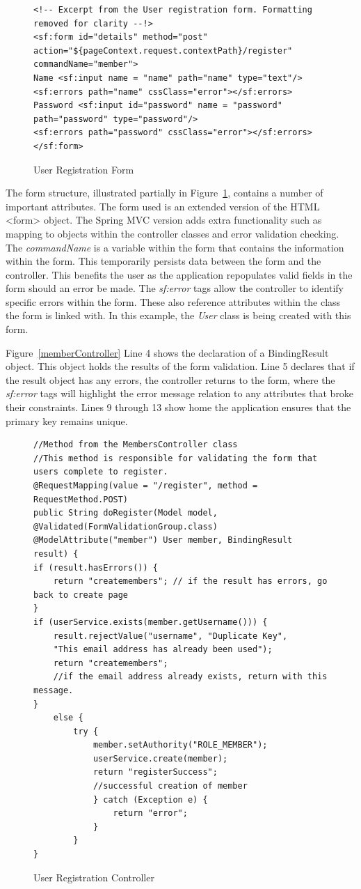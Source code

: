 \begin{figure}[H]
\begin{lstlisting}
<!-- Excerpt from the User registration form. Formatting removed for clarity --!>
<sf:form id="details" method="post" action="${pageContext.request.contextPath}/register" commandName="member">
Name <sf:input name = "name" path="name" type="text"/>
<sf:errors path="name" cssClass="error"></sf:errors>
Password <sf:input id="password" name = "password" path="password" type="password"/>
<sf:errors path="password" cssClass="error"></sf:errors>
</sf:form>
\end{lstlisting}
\caption{User Registration Form}
\label{fig:memberForm}
\end{figure}

The form structure, illustrated partially in Figure~\ref{fig:memberForm}, contains a number of important attributes. The form used is an extended version of the HTML <form> object. The Spring MVC version adds extra functionality such as mapping to objects within the controller classes and error validation checking. The \textit{commandName} is a variable within the form that contains the information within the form. This temporarily persists data between the form and the controller. This benefits the user as the application repopulates valid fields in the form should an error be made. The \textit{sf:error} tags allow the controller to identify specific errors within the form. These also reference attributes within the class the form is linked with. In this example, the \textit{User} class is being created with this form. 

Figure~\ref{memberController} Line 4 shows the declaration of a BindingResult object. This object holds the results of the form validation. Line 5 declares that if the result object has any errors, the controller returns to the form, where the \textit{sf:error} tags will highlight the error message relation to any attributes that broke their constraints. Lines 9 through 13 show home the application ensures that the primary key remains unique. 

\begin{figure}[H]
\begin{lstlisting}
//Method from the MembersController class
//This method is responsible for validating the form that users complete to register.
@RequestMapping(value = "/register", method = RequestMethod.POST)
public String doRegister(Model model,
@Validated(FormValidationGroup.class) @ModelAttribute("member") User member, BindingResult result) {
if (result.hasErrors()) {
	return "createmembers"; // if the result has errors, go back to create page
}
if (userService.exists(member.getUsername())) {
	result.rejectValue("username", "Duplicate Key",
	"This email address has already been used");
	return "createmembers";
	//if the email address already exists, return with this message.
}
	else {
		try {
			member.setAuthority("ROLE_MEMBER");
			userService.create(member);
			return "registerSuccess";
			//successful creation of member
			} catch (Exception e) {
				return "error";
			}
		}
}
\end{lstlisting}
\caption{User Registration Controller}
\label{fig:memberController}
\end{figure}

